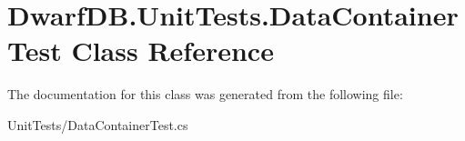 \hypertarget{class_dwarf_d_b_1_1_unit_tests_1_1_data_container_test}{\section{Dwarf\+D\+B.\+Unit\+Tests.\+Data\+Container\+Test Class Reference}
\label{class_dwarf_d_b_1_1_unit_tests_1_1_data_container_test}
}


The documentation for this class was generated from the following file\+:\begin{DoxyCompactItemize}
\item 
Unit\+Tests/Data\+Container\+Test.\+cs\end{DoxyCompactItemize}
